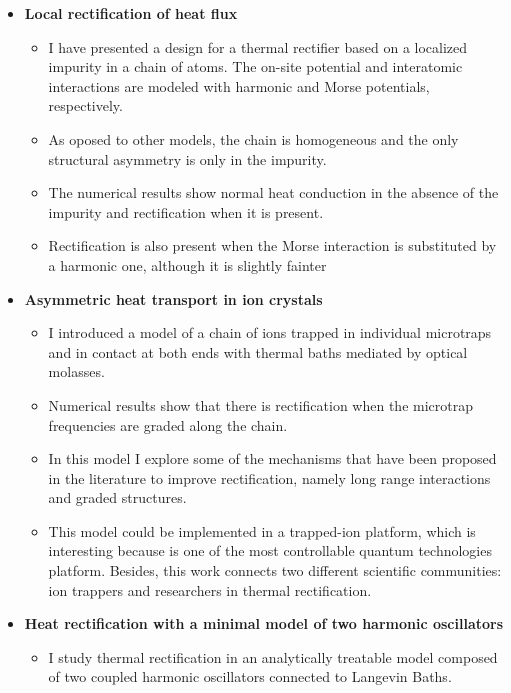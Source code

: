 \begin{itemize}
  \item {\bf Local rectification of heat flux}
  \begin{itemize}
    \item I have presented a design for a thermal rectifier based on a localized impurity in a chain of atoms. The on-site potential and interatomic interactions are modeled with harmonic and Morse potentials, respectively.

    \item As oposed to other models, the chain is homogeneous and the only structural asymmetry is only in the impurity.

    \item The numerical results show normal heat conduction in the absence of the impurity and rectification when it is present.

    \item Rectification is also present when the Morse interaction is substituted by a harmonic one, although it is slightly fainter

  \end{itemize}

  \item {\bf Asymmetric heat transport in ion crystals}
  \begin{itemize}
    \item I introduced a model of a chain of ions trapped in individual microtraps and in contact at both ends with thermal baths mediated by optical molasses.

    \item Numerical results show that there is rectification when the microtrap frequencies are graded along the chain.

    \item In this model I explore some of the mechanisms that have been proposed in the literature to improve rectification, namely long range interactions and graded structures.

    \item This model could be implemented in a trapped-ion platform, which is interesting because is one of the most controllable quantum technologies platform. Besides, this work connects two different scientific communities: ion trappers and researchers in thermal rectification.
  \end{itemize}

  \item {\bf Heat rectification with a minimal model of two harmonic oscillators}
  \begin{itemize}
    \item  I study thermal rectification in an analytically treatable model
    composed of two coupled harmonic oscillators connected to Langevin Baths.


\end{itemize}
\end{itemize}
